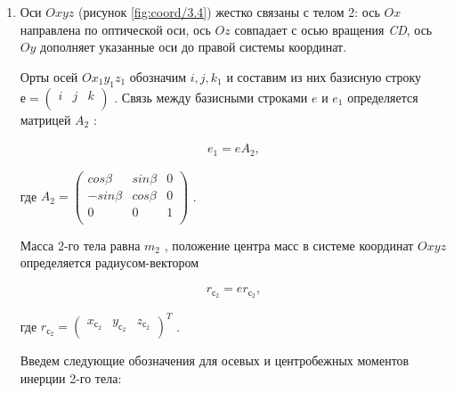 \begin{enumerate}
	\item Оси  \( Oxyz \)  (рисунок \ref{fig:coord/3.4}) жестко связаны с телом 2: ось  \( Ox \)  направлена по оптической оси, ось  \( Oz \)  совпадает с осью вращения \textit{CD}, ось  \( Oy \)  дополняет указанные оси до правой системы координат.\par
	
	Орты осей  \( Ox_{1}y_{1}z_{1} \)  обозначим  \( i,j,k_{1} \)  и составим из них базисную строку  \( е= \left( \begin{matrix}
	i  &  j  &  k\\
	\end{matrix}
	\right)  \) . Связь между базисными строками  \( e \)  и  \( e_{1} \)  определяется матрицей  \( A_{2} \) :\par
	
	\begin{equation}
	\label{eq:p3:5}
	\begin{alignedat}{2}
	e_{1}=eA_{2},
	\end{alignedat}
	\end{equation}
	
	где  \( A_{2}= \left( \begin{matrix}
	cos \beta   &  sin \beta   &  0\\
	-sin \beta   &  cos \beta   &  0\\
	0  &  0  &  1\\
	\end{matrix}
	\right)  \) .\par
	
	Масса 2-го тела равна  \( m_{2} \) , положение центра масс в системе координат  \( Oxyz \)  определяется радиусом-вектором\par
	
	\begin{equation}
	\label{eq:p3:6}
	\begin{alignedat}{2}
	r_{с_{2}}=e r_{с_{2}},
	\end{alignedat}
	\end{equation}
	
	где  \( r_{с_{2}}= \left( \begin{matrix}
	x_{с_{2}}  &  y_{с_{2}}  &  z_{с_{2}}\\
	\end{matrix}
	\right) ^{T} \) .\par
	
	Введем следующие обозначения для осевых и центробежных моментов инерции 2-го тела:\par
	

\end{enumerate}
